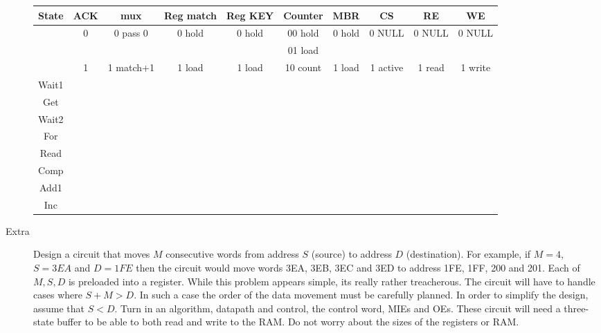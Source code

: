 \begin{description}
{\tiny
\begin{tabular}{c||c|c|c|c|c|c|c|c|c}  
State   & ACK   & mux       &  Reg match& Reg KEY & Counter     & MBR    & CS       & RE     & WE       \\ \hline
        & 0     & 0 pass 0  &  0 hold   & 0 hold  & 00 hold     & 0 hold & 0 NULL   & 0 NULL & 0 NULL   \\ \hline
        &       &           &           &         & 01 load     &        &          &        &          \\ \hline
        & 1     & 1 match+1 &  1 load   & 1 load  & 10 count    & 1 load & 1 active & 1 read & 1 write  \\ \hline \hline
Wait1   &      &          &          &        &           &       &         &       &          \\ \hline
Get     &      &          &          &        &           &       &         &       &          \\ \hline
Wait2   &      &          &          &        &           &       &         &       &          \\ \hline
For     &      &          &          &        &           &       &         &       &          \\ \hline
Read    &      &          &          &        &           &       &         &       &          \\ \hline
Comp    &      &          &          &        &           &       &         &       &          \\ \hline
Add1    &      &          &          &        &           &       &         &       &          \\ \hline
Inc     &      &          &          &        &           &       &         &       &          \\ 
\end{tabular} }

\pagebreak

\item [Extra]
Design a circuit that moves $M$ consecutive words from address $S$ (source) to
address $D$ (destination).  For example, if $M=4$, $S=3EA$ and $D=1FE$ then the
circuit would move words 3EA, 3EB, 3EC and 3ED to address 1FE, 1FF, 200 and 201.
Each of $M,S,D$ is preloaded into a register.  While this problem appears simple,
its really rather treacherous.  The circuit will have to handle cases where
$S+M > D$.  In such a case the order of the data movement must be carefully planned.
In order to simplify the design, assume that $S<D$.  Turn in an algorithm,
datapath and control, the
control word, MIEs and OEs.  These circuit will need a three-state buffer to
be able to both read and write to the RAM.  Do not worry about the sizes of the
registers or RAM.


\end{description}
